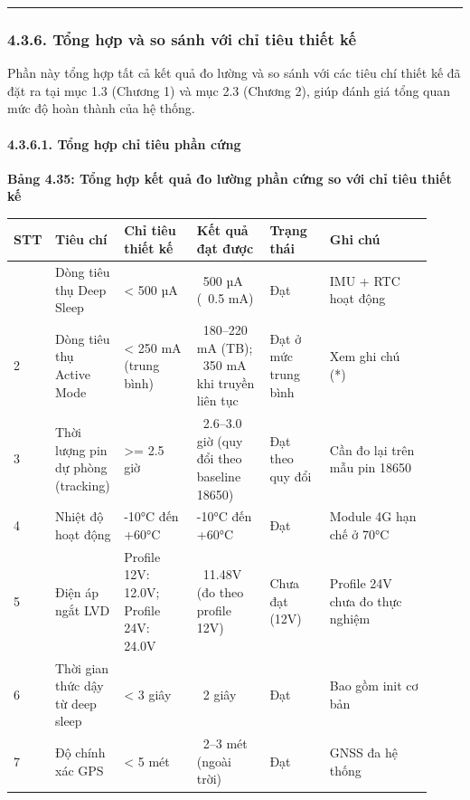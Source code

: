 \documentclass[13pt,a4paper]{extarticle}
\newcounter{none} %
\newcommand{\thesislongtableorignewline}{}
\let\thesislongtableorignewline\\
\renewcommand{\\}{\thesislongtableorignewline\hline}%
\let\\\thesislongtableorignewline
\newcommand{\thesistabletitle}[1]{%
  \begin{center}\textbf{#1}\end{center}%
}
\begin{document}
\begin{center}\rule{0.5\linewidth}{0.5pt}\end{center}

\subsubsection{4.3.6. Tổng hợp và so sánh với chỉ tiêu thiết
kế}\label{436-tux1ed5ng-hux1ee3p-vuxe0-so-suxe1nh-vux1edbi-chux1ec9-tiuxeau-thiux1ebft-kux1ebf}

Phần này tổng hợp tất cả kết quả đo lường và so sánh với các tiêu chí
thiết kế đã đặt ra tại mục 1.3 (Chương 1) và mục 2.3 (Chương 2), giúp
đánh giá tổng quan mức độ hoàn thành của hệ thống.

\paragraph{4.3.6.1. Tổng hợp chỉ tiêu phần
cứng}\label{4361-tux1ed5ng-hux1ee3p-chux1ec9-tiuxeau-phux1ea7n-cux1ee9ng}

\thesistabletitle{Bảng 4.35: Tổng hợp kết quả đo lường phần cứng so với chỉ tiêu thiết
kế}

{\def\LTcaptype{none} %
\begin{longtable}{|p{0.06\linewidth}|p{0.14\linewidth}|p{0.17\linewidth}|p{0.17\linewidth}|p{0.14\linewidth}|p{0.24\linewidth}|}
\hline \textbf{STT} & \textbf{Tiêu chí} & \textbf{Chỉ tiêu thiết kế} & \textbf{Kết quả đạt được} & \textbf{Trạng thái} & \textbf{Ghi
chú} \\
\hline
\endhead
\hline
\endlastfoot
1 & Dòng tiêu thụ Deep Sleep & \textless{} 500 µA & ~500
µA (~0.5 mA) & Đạt & IMU + RTC hoạt động \\
2 & Dòng tiêu thụ Active Mode & \textless{} 250 mA (trung bình) &
~180--220 mA (TB); ~350 mA khi truyền liên
tục & Đạt ở mức trung bình & Xem ghi chú (*) \\
3 & Thời lượng pin dự phòng (tracking) & \textgreater= 2.5 giờ &
~2.6--3.0 giờ (quy đổi theo baseline 18650) & Đạt theo quy
đổi & Cần đo lại trên mẫu pin 18650 \\
4 & Nhiệt độ hoạt động & -10°C đến +60°C & -10°C đến +60°C & Đạt &
Module 4G hạn chế ở 70°C \\
5 & Điện áp ngắt LVD & Profile 12V: 12.0V; Profile 24V: 24.0V &
~11.48V (đo theo profile 12V) & Chưa đạt (12V) & Profile
24V chưa đo thực nghiệm \\
6 & Thời gian thức dậy từ deep sleep & \textless{} 3 giây &
~2 giây & Đạt & Bao gồm init cơ bản \\
7 & Độ chính xác GPS & \textless{} 5 mét & ~2--3 mét
(ngoài trời) & Đạt & GNSS đa hệ thống \\
\end{longtable}
}
\end{document}
